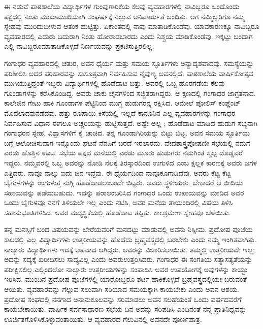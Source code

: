 {ಈ ನಡುವೆ ಪಾಠಶಾಲೆಯ ವಿದ್ಯಾರ್ಥಿಗಳ ಗುಂಪುಗಾರಿಕೆಯ ಕೆಲವು ವ್ಯವಹಾರ\-ಗಳಲ್ಲಿ ನಾವಿಬ್ಬರೂ ಒಂದೊಂದು ಪಕ್ಷದಲ್ಲಿ ನಿಂತು ಮುಖಾಮುಖಿಯಾಗಿ \-ಸಂಘರ್ಷಕ್ಕೆ ನಿಲ್ಲುವ  ಅನಿವಾರ್ಯತೆ ಬಂದಿತ್ತು. ಆಗ ನಮ್ಮಿಬ್ಬರಿಗೂ ನಮ್ಮ ಸ್ನೇಹವು ಮುರಿದು\break ಬೀಳುವ ಆತಂಕ ಹುಟ್ಟಿತ್ತು. ಏಕಾಂತದಲ್ಲಿ ನಾವು ಮಾತಾಡಿಕೊಂಡೆವು. ಯಾವ\break ಕಾರಣಕ್ಕೂ ನಾವಿಬ್ಬರೂ ವ್ಯವಹಾರದಲ್ಲಿ ಎದುರು ಬದುರಾಗಿ ನಿಂತು ಹೋರಾಡ\-ಬಾರದು ಎಂದು ನಿಶ್ಚಯ ಮಾಡಿಕೊಂಡೆವು. ಇಕ್ಕಟ್ಟು ಬಂದಾಗ ಎಲ್ಲಿ ನಾವಿಬ್ಬರೂ\break ಮಾತಾಡಿಕೊಳ್ಳದೆ ನಿರ್ಣಯವನ್ನು ಪ್ರಕಟಿಸುತ್ತಿರಲಿಲ್ಲ. 

ಗಂಗಾಧರ ವ್ಯವಹಾರದಲ್ಲಿ ಚತುರ, ಅವನ ಧೈರ್ಯ ಮತ್ತು ಸಮಯ ಸ್ಫೂರ್ತಿ\-ಗಳು ಅನ್ಯಾದೃಶವಾದವು. ಸಮಸ್ಯೆಯನ್ನು ಪರಿಶೀಲಿಸಿ ಅದರ ಪರಿಹಾರವನ್ನು ಸುಸೂತ್ರ\-ವಾಗಿ ನಿರ್ವಹಿಸುವ ನೈಪುಣ್ಯ ಅವನಲ್ಲಿದೆ. ಪಾಠಶಾಲೆಯ ವಾರ್ಷಿಕೋತ್ಸವ ಮುಗಿಯು\-ತ್ತಿದ್ದಂತೆ ಇಬ್ಬರು ವಿದ್ಯಾರ್ಥಿಗಳಲ್ಲಿ ಹೊಡೆದಾಟ ಬಿತ್ತು. ಅವರಲ್ಲಿ ಒಬ್ಬ ಹೊರಗಡೆಯ ಕೆಲವು ಗೂಂಡಾಗಳನ್ನು ಕರೆಸಿಕೊಂಡಿದ್ದ. ಅವರು ಚಾಕು ಚೈನಗಳಿಂದ ಸಜ್ಜಿತರಾಗಿದ್ದರು. ಆ ಕ್ಷಣದಲ್ಲಿ ಗಂಗಾಧರ ಜಾಗ್ರತನಾದ. ಕಾಲೇಜಿನ ಗೇಟು ಹಾಕಿ ಗೂಂಡಾಗಳ ಪೆಟ್ಟಿನಿಂದ ಮುಗ್ಧ ಹುಡುಗರನ್ನ ರಕ್ಷಿಸಿದ. ಆಮೇಲೆ ಪೋಲಿಸ್ ಕಂಪ್ಲೆಂಟ್ ಮೊದಲಾದವು\break ನಡೆದವು. ಹತ್ತು ರೂಪಾಯಿ ಕಿಸೆಯಲ್ಲಿ ಇಲ್ಲದೆ ಕಾನೂನಿನ ಎಲ್ಲ ವ್ಯವಹಾರಗಳನ್ನು ಗಂಗಾಧರ   ನಿರ್ವಹಿಸುವ ವಿಧಾನ ಈಗಲೂ ಅಚ್ಚರಿಯನ್ನು ಹುಟ್ಟಿಸುತ್ತದೆ. ಅಷ್ಟೇ ಅಲ್ಲ ; ಹೊಡೆದಾಟ ಮಾಡಿದ ಹುಡುಗ ಸಭ್ಯನಾಗಿ ಗಂಗಾಧರನ ಸ್ನೇಹ, ವಿಶ್ವಾಸಗಳಿಗೆ ಕೈ ಚಾಚಿದ.  ತನ್ನ ಗೂಂಡಾಗಿರಿಯನ್ನು ಬಿಟ್ಟು ಬಿಟ್ಟ. ಅವನ ಸಮಯ ಸ್ಫೂರ್ತಿಯ ಬಗ್ಗೆ ಆಲೋಚಿಸುವಾಗ ಇನ್ನೊಂದು ಘಟನೆ ನೆನಪಿಗೆ ಬರದೆ ಇರಲಾರದು. ವೇದಶಾಸ್ತ್ರ\break ಪೋಷಣೀ ಸಭೆಯಲ್ಲಿ ನಮಗೆ ಎರಡು ಹೊತ್ತಿನ ಊಟ. ಸಭೆಯ ಪಕ್ಕದ ಮನೆಯಲ್ಲಿ ಎರಡು ಮೂರು ಹುಡುಗರು ನಮಗಿಂತ ಸ್ವಲ್ಪ ದೊಡ್ಡವರೆ ಇದ್ದರು. ನಮ್ಮವರಲ್ಲಿ ಒಬ್ಬ ಅವರನ್ನು ನೋಡಿ ನೆಲಕ್ಕೆ ತಿರಸ್ಕಾರದಿಂದ ಉಗುಳಿದ ಎಂಬ ಕ್ಷಲ್ಲಕ ಕಾರಣಕ್ಕೆ ಅವರು ಜಗಳ ಎತ್ತಿದರು. ನಾವೂ ನಾಲ್ಕು ಐದು ಜನ ಇದ್ದೆವು. ಈ ಧೈರ್ಯದಿಂದ ನಾವೂ\break ಕೂಗಾಡಿದೆವು. ಅವರು ಕೆಟ್ಟ ಕೆಟ್ಟ ಬೈಗುಳಗಳನ್ನು ಉಗುಳುತ್ತ ನುಗ್ಗಿ ಹೊಡೆದಾಡಲು\break ಬಂದೇ ಬಿಟ್ಟರು. ಅವರು ಸ್ಥಳೀಯರು. ಬೇಕಾದರೆ ಆ ಬೀದಿಯ ಸಹಾಯವನ್ನು ಪಡೆಯ\-ಬಹುದು. ಇದನ್ನು ಪರಾಲಂಬರಿಸಿದ ಗಂಗಾಧರ ಒಂದು ಉಪಾಯವನ್ನು ಮಾಡಿದ ಅವರ ಒಂದು ಬೈಗುಳವೂ ನನಗೆ ತಿಳಿಯಲೇ ಇಲ್ಲ ಎಂದು ನಟಿಸಿ, ಅವರ ಮನೆಯ ತಾಯಂದಿರಲ್ಲಿ ವಿಷಯ ತಿಳಿಸಿ ಸಹಾನುಭೂತಿಗಳಿಸಿದ. ಅವರ ಮದ್ಯಸ್ಥಿಕೆ\-ಯಲ್ಲಿ ಹೊಡೆದಾಟ ತಪ್ಪಿತು. ಕಾಲಕ್ರಮೇಣ ಸ್ನೇಹವೂ ಬೆಳೆಯಿತು. 

ತನ್ನ  ಮನಸ್ಸಿಗೆ ಬಂದ ವಿಷಯವನ್ನು ಬೇರೆಯವರಿಗೆ ಮನದಟ್ಟು ಮಾಡುವಲ್ಲಿ ಅವನು ನಿಸ್ಸೀಮ. ಪ್ರದೋಷ ಪೂಜೆಯ ಕಾಲದಲ್ಲಿ ಎಲ್ಲ ವಿದ್ಯಾರ್ಥಿಗಳು ಉತ್ತರೀಯವನ್ನು ಹೊದೆದು ಬ್ರಹ್ಮವಸ್ತ್ರದಲ್ಲಿ ಬರಬೇಕು ಎಂದು ನಮ್ಮ ಇಂಗಿತವಾಗಿತ್ತು. ನಾಲ್ಕಾರು ವಿದ್ಯಾರ್ಥಿಗಳು ಇದಕ್ಕೆ ಅಪವಾದ ಆಗಿದ್ದರು. ಅವರನ್ನು ವಿಚಾರಿಸಲಾಯಿತು. ತಮ್ಮಲ್ಲಿ ಉತ್ತರೀಯವೇ ಇಲ್ಲ; ಅದನ್ನು ಸದ್ಯಕ್ಕೆ ಖರೀದಿಸಲು ಸಾದ್ಯವಿಲ್ಲ ಎಂದು ಅವರು\break ಉತ್ತರಿಸಿದರು. ಗಂಗಾಧರ ಈ ಸಂಗತಿಯ ಸತ್ಯಾಸತ್ಯತೆಯನ್ನು ಪರೀಕ್ಷಿಸಲಿಲ್ಲ.\break ಎಲ್ಲಿಂದಲೋ ನಾಲ್ಕಾರು ಉತ್ತರೀಯಗಳನ್ನು ಸಂಪಾದಿಸಿ ಅವರ   ಉಪಯೋಗಕ್ಕೆ ಅವು\-ಗಳನ್ನು ಕಾಯ್ದು ಇರಿಸಿದ. ಮುಂದಿನ ಪ್ರದೋಷ ಪೂಜೆಗಳಲ್ಲಿ  ಯಾರೋಬ್ಬರೂ ಶರ್ಟ ಹಾಕಿಕೊಳ್ಳದೆ ಬ್ರಹ್ಮವಸ್ತ್ರದಲ್ಲಿಯೇ ಬರುವಂತೆ ಆಯಿತು. ವ್ಯವಹಾರವನ್ನು ಗೆಲ್ಲುವ ಸಲುವಾಗಿ ಸರಿಯಾದ ಸಮಯಕ್ಕಾಗಿ ಕಾಯಬೇಕು ಎಂದು ಅವನ ಆಶಯ. ಪ್ರದೋಷ ಸಂಘದಲ್ಲಿ ನನಗಾದ  ಅನಾನುಕೂಲವನ್ನು ಸರಿಮಾಡಲು ಅವನ ಸಲಹೆಯಂತೆ ಒಂದು ವರ್ಷದವರೆಗೆ ಕಾಯಬೇಕಾಯಿತು. ವಾರ್ಷಿಕ ಸರ್ವಸಾಧಾರಣ ಸಭೆಯ ದಿನ ಅದನ್ನು ಸರಿಪಡಿಸಿ ಎಂದಿನಂತೆ ನನ್ನ ಪ್ರಾತಿನಿಧ್ಯವನ್ನು ಊರ್ಜಿತಗೊಳಿಸಿಕೊಳ್ಳುವಂತಾಯಿತು.  ಆ ವ್ಯವಹಾರದ ಗೆಲುವಿನಲ್ಲಿ ಅವನದೇ ಪೂರ್ಣಪಾತ್ರ. 

}
